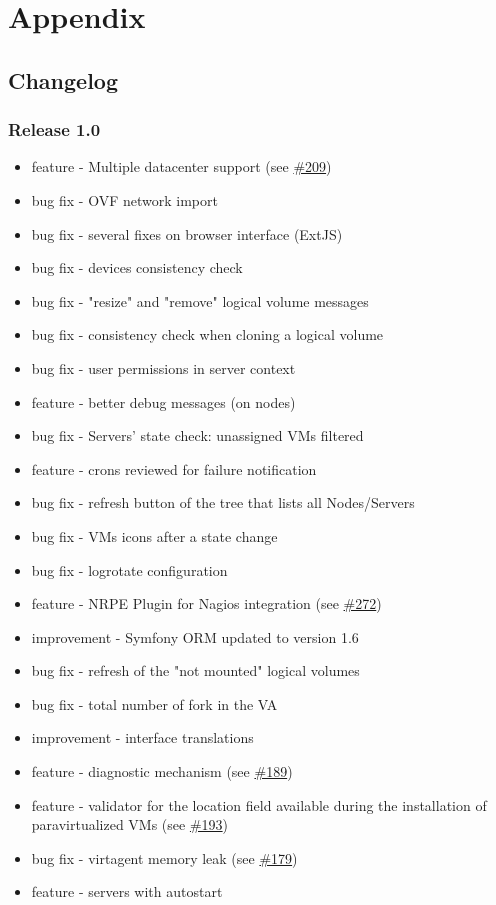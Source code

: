 \chapter{Appendix}

\section{Changelog}

\subsection{Release 1.0}

\begin{itemize}
\item feature - Multiple datacenter support (see \href{https://srcmaster.eurotux.com/pm/p/etva/ticket/209}{\#209})
\item bug fix - OVF network import
\item bug fix - several fixes on browser interface (ExtJS)
\item bug fix - devices consistency check
\item bug fix - "resize" and "remove" logical volume messages
\item bug fix - consistency check when cloning a logical volume
\item bug fix - user permissions in server context
\item feature - better debug messages (on nodes)
\item bug fix - Servers' state check: unassigned VMs filtered
\item feature - crons reviewed for failure notification
\item bug fix - refresh button of the tree that lists all Nodes/Servers
\item bug fix - VMs icons after a state change
\item bug fix - logrotate configuration
\item feature - NRPE Plugin for Nagios integration (see \href{https://srcmaster.eurotux.com/pm/p/etva/ticket/272}{\#272})
\item improvement - Symfony ORM updated to version 1.6
\item bug fix - refresh of the "not mounted" logical volumes
\item bug fix - total number of fork in the VA
\item improvement - interface translations
\item feature - diagnostic mechanism (see \href{https://srcmaster.eurotux.com/pm/p/etva/ticket/189}{\#189})
\item feature - validator for the location field available during the installation of paravirtualized VMs (see \href{https://srcmaster.eurotux.com/pm/p/etva/ticket/193}{\#193})
\item bug fix - virtagent memory leak (see \href{https://srcmaster.eurotux.com/pm/p/etva/ticket/179}{\#179})
\item feature - servers with autostart
\end{itemize}

